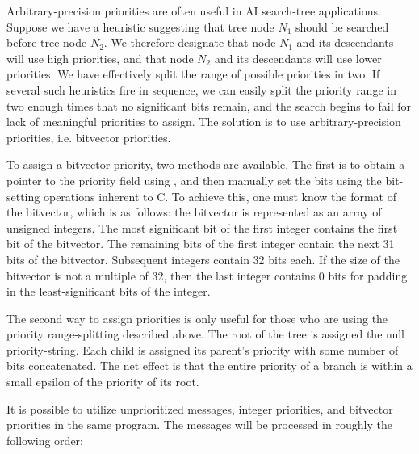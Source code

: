 Arbitrary-precision priorities are often
useful in AI search-tree applications.  Suppose we have a heuristic suggesting
that tree node $N_1$ should be searched before tree node $N_2$.  We therefore
designate that node $N_1$ and its descendants will use high priorities, and
that node $N_2$ and its descendants will use lower priorities.  We have
effectively split the range of possible priorities in two.  If several such
heuristics fire in sequence, we can easily split the priority range
 in two enough times that no significant bits
remain, and the search begins to fail for lack of meaningful priorities to
assign.  The solution is to use arbitrary-precision priorities, i.e. bitvector
priorities.

To assign a bitvector priority, two methods are available.  The first is to
obtain a pointer to the priority field using , and then
manually set the bits using the bit-setting operations inherent to C.  To
achieve this, one must know the format  of the
bitvector, which is as follows: the bitvector is represented as an array of
unsigned integers.  The most significant bit of the first integer contains the
first bit of the bitvector.  The remaining bits of the first integer contain
the next 31 bits of the bitvector.  Subsequent integers contain 32 bits each.
If the size of the bitvector is not a multiple of 32, then the last integer
contains 0 bits for padding in the least-significant bits of the integer.

The second way to assign priorities is only useful for those who are using the
priority range-splitting described above.  The
root of the tree is assigned the null priority-string.  Each child is assigned
its parent's priority with some number of bits concatenated.  The net effect is
that the entire priority of a branch is within a small epsilon of the priority
of its root.

It is possible to utilize unprioritized messages, integer priorities, and
bitvector priorities in the same program.  The messages will be processed in
roughly the following order:

